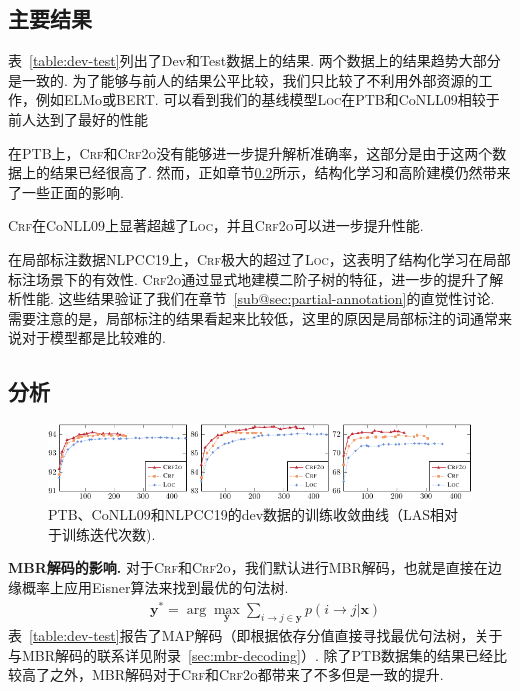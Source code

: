 \subsection{主要结果}

表~\ref{table:dev-test}列出了Dev和Test数据上的结果.
两个数据上的结果趋势大部分是一致的.
为了能够与前人的结果公平比较，我们只比较了不利用外部资源的工作，例如ELMo\cite{peters-etal-2018-deep}或BERT\cite{devlin-etal-2019-bert}.
可以看到我们的基线模型\textsc{Loc}在PTB和CoNLL09相较于前人达到了最好的性能

在PTB上，\textsc{Crf}和\textsc{Crf2o}没有能够进一步提升解析准确率，这部分是由于这两个数据上的结果已经很高了.
然而，正如章节\ref{subsec:dep-analysis}所示，结构化学习和高阶建模仍然带来了一些正面的影响.

\textsc{Crf}在CoNLL09上显著超越了\textsc{Loc}，并且\textsc{Crf2o}可以进一步提升性能.

在局部标注数据NLPCC19上，\textsc{Crf}极大的超过了\textsc{Loc}，这表明了结构化学习在局部标注场景下的有效性.
\textsc{Crf2o}通过显式地建模二阶子树的特征，进一步的提升了解析性能.
这些结果验证了我们在章节~\ref{sub@sec:partial-annotation}的直觉性讨论.
需要注意的是，局部标注的结果看起来比较低，这里的原因是局部标注的词通常来说对于模型都是比较难的.

\subsection{分析}
\label{subsec:dep-analysis}

\begin{figure}[tb!]
    \centering
    \includegraphics[width=\textwidth]{figures/convergency.pdf}
    \caption{
        PTB、CoNLL09和NLPCC19的dev数据的训练收敛曲线（LAS相对于训练迭代次数).}
    \label{fig:convergency}
\end{figure}

\noindent\textbf{MBR解码的影响.}
对于\textsc{Crf}和\textsc{Crf2o}，我们默认进行MBR解码，也就是直接在边缘概率上应用Eisner算法\cite{smith-smith-2007-probabilistic}来找到最优的句法树.
\begin{equation}
    \begin{split}
        & {\boldsymbol{y}}^* = \arg\max_{\boldsymbol{y}} \sum_{i \rightarrow j \in \boldsymbol{y}}{p(i \rightarrow j|\boldsymbol{x})}
    \end{split}
\end{equation}
表~\ref{table:dev-test}报告了MAP解码（即根据依存分值直接寻找最优句法树，关于与MBR解码的联系详见附录~\ref{sec:mbr-decoding}）.
除了PTB数据集的结果已经比较高了之外，MBR解码对于\textsc{Crf}和\textsc{Crf2o}都带来了不多但是一致的提升.

